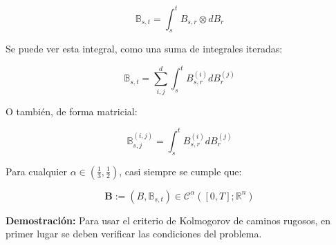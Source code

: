 \[
	\mathbb{B}_{s,t} = \int_s^t B_{s,r} \otimes dB_r
\]

Se puede ver esta integral, como una suma de integrales iteradas:

\[
	\mathbb{B}_{s,t} = \sum_{i,j}^d \int_s^t	 B_{s,r}^{(i)} dB_r^{(j)}
\]

O también, de forma matricial:

\[
	\mathbb{B}_{s,j}^{(i,j)} = \int_s^t	 B_{s,r}^{(i)} dB_r^{(j)}	
\]

\begin{prop}
	Para cualquier $\alpha \in \left( \frac{1}{3}, \frac{1}{2} \right)$, casi siempre se cumple que:

	\[
		\mathbf{B} := (B, \mathbb{B}_{s,t}) \in \mathcal{C}^{\alpha}([0,T]; \mathbb{R}^n)
	\]
\end{prop}

\textbf{Demostración:} Para usar el criterio de Kolmogorov de caminos rugosos, en primer lugar se deben verificar las condiciones del problema.

